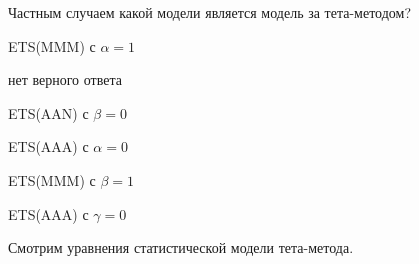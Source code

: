 
\begin{question}
Частным случаем какой модели является модель за тета-методом?
\begin{answerlist}
  \item ETS(MMM) с \(\alpha=1\)
  \item нет верного ответа
  \item ETS(AAN) с \(\beta=0\)
  \item ETS(AAA) с \(\alpha=0\)
  \item ETS(MMM) с \(\beta=1\)
  \item ETS(AAA) с \(\gamma=0\)
\end{answerlist}
\end{question}

\begin{solution}
Смотрим уравнения статистической модели тета-метода.
\end{solution}

